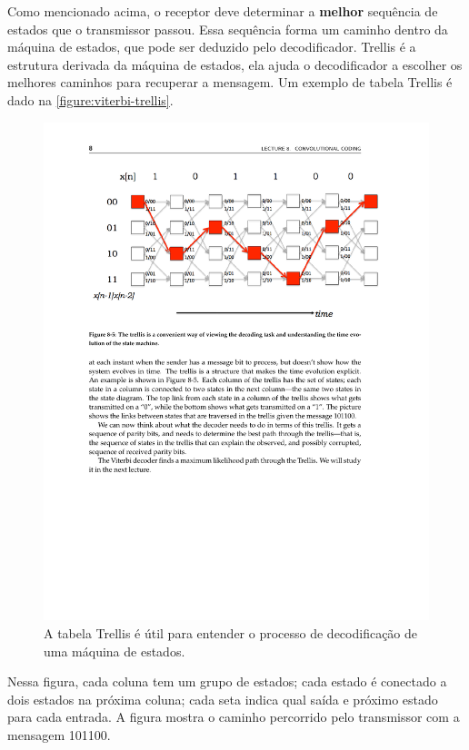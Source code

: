 	Como mencionado acima, o receptor deve determinar a \textbf{melhor} sequência de estados que o transmissor passou. Essa sequência forma um caminho dentro da máquina de estados, que pode ser deduzido pelo decodificador. Trellis é a estrutura derivada da máquina de estados, ela ajuda o decodificador a escolher os melhores caminhos para recuperar a mensagem. Um exemplo de tabela Trellis é dado na \autoref{figure:viterbi-trellis}.
	\begin{figure}[htb]
		\caption{\label{figure:viterbi-trellis}A tabela Trellis é útil para entender o processo de decodificação de uma máquina de estados.}
		\centering
		\includegraphics[width=0.6\textheight,trim={0cm 18cm 0cm 2.5cm},clip]{viterbi/trellis.pdf}
	\end{figure}
	Nessa figura, cada coluna tem um grupo de estados; cada estado é conectado a dois estados na próxima coluna; cada seta indica qual saída e próximo estado para cada entrada. A figura mostra o caminho percorrido pelo transmissor com a mensagem 101100.

